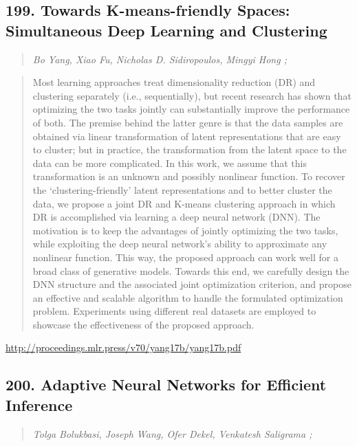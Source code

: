\documentclass{article}
\begin{document}
\subsection{199. Towards K-means-friendly Spaces: Simultaneous Deep Learning and Clustering}

\begin{quote}
\footnotesize{\textit{Bo Yang, Xiao Fu, Nicholas D. Sidiropoulos, Mingyi Hong ;}}

\end{quote}

\begin{quote}
    Most learning approaches treat dimensionality reduction (DR) and clustering separately (i.e., sequentially), but recent research has shown that optimizing the two tasks jointly can substantially improve the performance of both. The premise behind the latter genre is that the data samples are obtained via linear transformation of latent representations that are easy to cluster; but in practice, the transformation from the latent space to the data can be more complicated. In this work, we assume that this transformation is an unknown and possibly nonlinear function. To recover the `clustering-friendly’ latent representations and to better cluster the data, we propose a joint DR and K-means clustering approach in which DR is accomplished via learning a deep neural network (DNN). The motivation is to keep the advantages of jointly optimizing the two tasks, while exploiting the deep neural network’s ability to approximate any nonlinear function. This way, the proposed approach can work well for a broad class of generative models. Towards this end, we carefully design the DNN structure and the associated joint optimization criterion, and propose an effective and scalable algorithm to handle the formulated optimization problem. Experiments using different real datasets are employed to showcase the effectiveness of the proposed approach.  
\end{quote}

\href{http://proceedings.mlr.press/v70/yang17b/yang17b.pdf}{http://proceedings.mlr.press/v70/yang17b/yang17b.pdf}

\subsection{200. Adaptive Neural Networks for Efficient Inference}

\begin{quote}
\footnotesize{\textit{Tolga Bolukbasi, Joseph Wang, Ofer Dekel, Venkatesh Saligrama ;}}

\end{quote}
\end{document}
